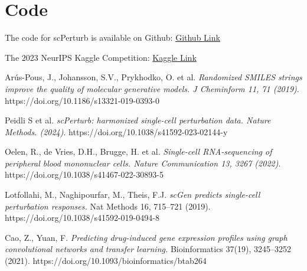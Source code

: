 \documentclass[11pt, oneside]{article}   	%
\begin{document}
\section*{Code}

The code for scPerturb is available on Github: 
\href{https://github.com/tigeryi1998/scPerturb}{Github Link}

The 2023 NeurIPS Kaggle Competition:
\href{https://www.kaggle.com/competitions/open-problems-single-cell-perturbations/overview}{Kaggle Link}



\begin{thebibliography}{9}

Arús-Pous, J., Johansson, S.V., Prykhodko, O. et al.
\textit{Randomized SMILES strings improve the quality of molecular generative models. J Cheminform 11, 71 (2019)}. https://doi.org/10.1186/s13321-019-0393-0


Peidli S et al.
\textit{scPerturb: harmonized single-cell perturbation data. Nature Methods. (2024)}.
https://doi.org/10.1038/s41592-023-02144-y


Oelen, R., de Vries, D.H., Brugge, H. et al.
\textit{Single-cell RNA-sequencing of peripheral blood mononuclear cells. Nature Communication 13, 3267 (2022)}.
https://doi.org/10.1038/s41467-022-30893-5

Lotfollahi, M., Naghipourfar, M., Theis, F.J.  
\textit{scGen predicts single-cell perturbation responses.}  
Nat Methods 16, 715–721 (2019). 
https://doi.org/10.1038/s41592-019-0494-8

Cao, Z., Yuan, F.  
\textit{Predicting drug-induced gene expression profiles using graph convolutional networks and transfer learning.}  
Bioinformatics 37(19), 3245–3252 (2021). https://doi.org/10.1093/bioinformatics/btab264


\end{thebibliography}
\end{document}
